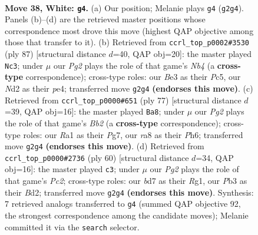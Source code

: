 \documentclass[11pt]{article}
\begin{document}
\clearpage

\begin{figure}[p]\centering
\begin{subfigure}{0.46\textwidth}\centering
\resizebox{\linewidth}{!}{%
\newchessgame
\chessboard[
  setfen={r7/3bk3/2n3R1/3p4/1p6/pP2B3/P1PN2PK/R7 w - - 5 38},
  showmover=false,
  pgfstyle=straightmove, color=movearrow, markmove={g2-g4}
]}
\caption{}
\end{subfigure}\hfill
\begin{subfigure}{0.46\textwidth}\centering
\resizebox{\linewidth}{!}{%
\newchessgame
\chessboard[
  setfen={8/p4k1p/P2p2p1/1npP4/4P2P/1r2BP2/5K2/3R4 b - - 0 44},
  showmover=false,
  pgfstyle=straightmove, color=movearrow, markmove={b5-c3}
]}
\caption{}
\end{subfigure}
\\[4pt]
\begin{subfigure}{0.46\textwidth}\centering
\resizebox{\linewidth}{!}{%
\newchessgame
\chessboard[
  setfen={8/rb2kpp1/4p2p/PB1n3P/8/1N3P2/6P1/2R3K1 b - - 0 39},
  showmover=false,
  pgfstyle=straightmove, color=movearrow, markmove={b7-a8}
]}
\caption{}
\end{subfigure}\hfill
\begin{subfigure}{0.46\textwidth}\centering
\resizebox{\linewidth}{!}{%
\newchessgame
\chessboard[
  setfen={3r2k1/4bpp1/1p6/3np1PP/8/1N6/1PPB4/1K4R1 w - - 0 31},
  showmover=false,
  pgfstyle=straightmove, color=movearrow, markmove={c2-c3}
]}
\caption{}
\end{subfigure}
\caption{\textbf{Move 38, White: \texttt{g4}.} (a) Our position; Melanie plays \texttt{g4} (\texttt{g2g4}). Panels (b)--(d) are the retrieved master positions whose correspondence most drove this move (highest QAP objective among those that transfer to it). (b) Retrieved from \texttt{ccrl\_top\_p0002\#3530} (ply 87) [structural distance $d$=40, QAP obj=20]: the master played \texttt{Nc3}; under $\mu$ our \emph{Pg2} plays the role of that game's \emph{Nb4} (a \textbf{cross-type} correspondence); cross-type roles: our \emph{B}e3 as their \emph{P}c5, our \emph{N}d2 as their \emph{p}e4; transferred move \texttt{g2g4} \textbf{(endorses this move)}. (c) Retrieved from \texttt{ccrl\_top\_p0000\#651} (ply 77) [structural distance $d$=39, QAP obj=16]: the master played \texttt{Ba8}; under $\mu$ our \emph{Pg2} plays the role of that game's \emph{Bb2} (a \textbf{cross-type} correspondence); cross-type roles: our \emph{R}a1 as their \emph{P}g7, our \emph{r}a8 as their \emph{P}h6; transferred move \texttt{g2g4} \textbf{(endorses this move)}. (d) Retrieved from \texttt{ccrl\_top\_p0000\#2736} (ply 60) [structural distance $d$=34, QAP obj=16]: the master played \texttt{c3}; under $\mu$ our \emph{Pg2} plays the role of that game's \emph{Pc2}; cross-type roles: our \emph{b}d7 as their \emph{R}g1, our \emph{P}b3 as their \emph{B}d2; transferred move \texttt{g2g4} \textbf{(endorses this move)}. Synthesis: 7 retrieved analogs transferred to \texttt{g4} (summed QAP objective 92, the strongest correspondence among the candidate moves); Melanie committed it via the \texttt{search} selector.}
\label{fig:thought-m74}
\end{figure}
\end{document}
